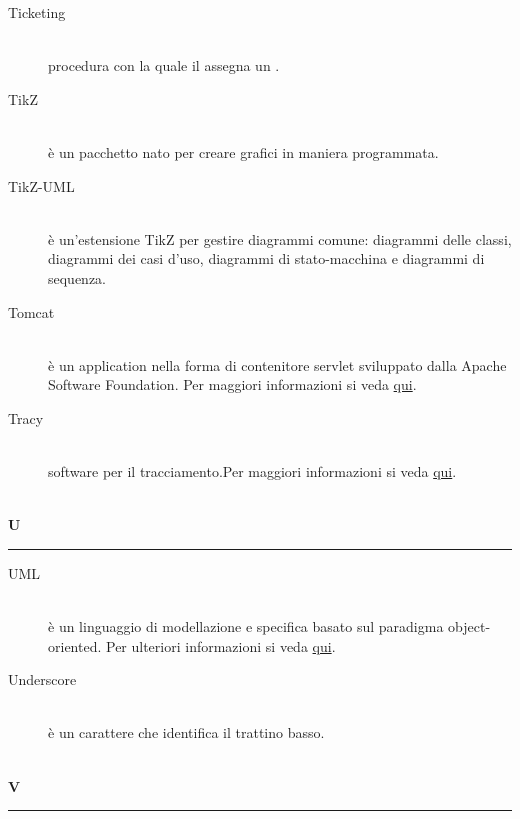 \documentclass[12pt,a4paper]{article}
\begin{document}
\begin{description}
\item[Ticketing] 
\hfill\\procedura con la quale il \RE assegna un .

\item[TikZ] 
\hfill\\è un pacchetto  nato per creare grafici in maniera programmata.

\item[TikZ-UML] 
\hfill\\è un'estensione TikZ per gestire diagrammi  comune: diagrammi delle classi, diagrammi dei casi d'uso, diagrammi di stato-macchina e diagrammi di sequenza.

\item[Tomcat] 
\hfill\\è un application  nella forma di contenitore servlet  sviluppato dalla Apache Software Foundation. Per maggiori informazioni si veda \href{https://it.wikipedia.org/wiki/Apache_Tomcat}{qui}.

\item[Tracy] 
\hfill\\software {} per il tracciamento.Per maggiori informazioni si veda \href{http://tracy-tpiga.rhcloud.com/tracy/}{qui}.
\end{description}

\newpage

\begin{center}
\hfill\\
	\LARGE \textbf{U}
\hfill\\
\rule[15pt]{30pt}{0.5pt}
\end{center}

\begin{description}
\item[UML] 
\hfill\\è un linguaggio di modellazione e specifica basato sul paradigma object-oriented. Per ulteriori informazioni si veda \href{http://it.wikipedia.org/wiki/Unified_Modeling_Language}{qui}.

\item[Underscore] 
\hfill\\è un carattere che identifica il trattino basso.
\end{description}

\newpage

\begin{center}
\hfill\\
	\LARGE \textbf{V}
\hfill\\
\rule[15pt]{30pt}{0.5pt}
\end{center}
\end{document}
